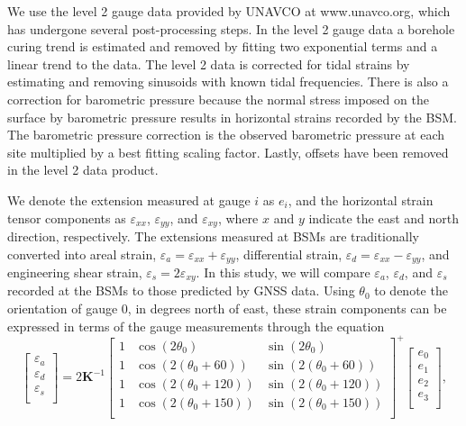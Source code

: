 \documentclass[10pt,a4paper]{article}
\begin{document}
We use the level 2 gauge data provided by UNAVCO at www.unavco.org, which has undergone several post-processing steps. In the level 2 gauge data a borehole curing trend is estimated and removed by fitting two exponential terms and a linear trend to the data. The level 2 data is corrected for tidal strains by estimating and removing sinusoids with known tidal frequencies. There is also a correction for barometric pressure because the normal stress imposed on the surface by barometric pressure results in horizontal strains recorded by the BSM. The barometric pressure correction is the observed barometric pressure at each site multiplied by a best fitting scaling factor. Lastly, offsets have been removed in the level 2 data product.    

We denote the extension measured at gauge $i$ as $e_i$, and the horizontal strain tensor components as $\varepsilon_{xx}$, $\varepsilon_{yy}$, and $\varepsilon_{xy}$, where $x$ and $y$ indicate the east and north direction, respectively. The extensions measured at BSMs are traditionally converted into areal strain, $\varepsilon_a = \varepsilon_{xx} + \varepsilon_{yy}$, differential strain, $\varepsilon_d = \varepsilon_{xx} - \varepsilon_{yy}$, and engineering shear strain, $\varepsilon_s = 2\varepsilon_{xy}$. In this study, we will compare $\varepsilon_a$, $\varepsilon_d$, and $\varepsilon_s$ recorded at the BSMs to those predicted by GNSS data. Using $\theta_0$ to denote the orientation of gauge 0, in degrees north of east, these strain components can be expressed in terms of the gauge measurements through the equation 
\begin{equation}\label{eq:GaugeToStrain}
\left[\begin{array}{c}
\varepsilon_a \\
\varepsilon_d \\
\varepsilon_s \\
\end{array}\right]
=
2\mathbf{K}^{-1}\left[\begin{array}{ccc}
1 & \cos(2\theta_0) & \sin(2\theta_0) \\
1 & \cos(2(\theta_0 + 60)) & \sin(2(\theta_0 + 60)) \\
1 & \cos(2(\theta_0 + 120)) & \sin(2(\theta_0 + 120)) \\
1 & \cos(2(\theta_0 + 150)) & \sin(2(\theta_0 + 150)) \\
\end{array}\right]^+
\left[\begin{array}{c}
e_0 \\
e_1 \\
e_2 \\
e_3 \\
\end{array}\right],
\end{equation} 
\end{document}
